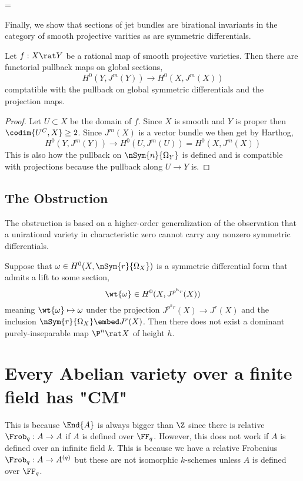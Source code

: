 =\documentclass[12pt]{article}
\begin{document}
Finally, we show that sections of jet bundles are birational invariants in the category of smooth projective varities as are symmetric differentials.

\begin{prop}
Let $f : X \rat Y$ be a rational map of smooth projective varieties. Then there are functorial pullback maps on global sections,
\[ H^0(Y, J^m(Y)) \to H^0(X, J^m(X)) \]
comptatible with the pullback on global symmetric differentials and the projection maps.
\end{prop}

\begin{proof}
Let $U \subset X$ be the domain of $f$. Since $X$ is smooth and $Y$ is proper then $\codim{U^C,X} \ge 2$. Since $J^m(X)$ is a vector bundle we then get by Harthog,
\[ H^0(Y, J^m(Y)) \to H^0(U, J^m(U)) = H^0(X, J^m(X)) \]
This is also how the pullback on $\nSym{n}{\Omega_Y}$ is defined and is compatible with projections because the pullback along $U \to Y$ is. 
\end{proof}


\subsection{The Obstruction}

The obstruction is based on a higher-order generalization of the observation that a unirational variety in characteristic zero cannot carry any nonzero symmetric differentials.

\begin{thm}
Suppose that $\omega \in H^0(X, \nSym{r}{\Omega_X})$ is a symmetric differential form that admits a lift to some section,
\[ \wt{\omega} \in H^0(X, J^{p^h r}(X)) \]
meaning $\wt{\omega} \mapsto \omega$ under the projection $J^{p^h r}(X) \to J^r(X)$ and the inclusion $\nSym{r}{\Omega_X} \embed J^r(X)$. Then there does not exist a dominant purely-inseparable map $\P^n \rat X$ of height $h$.
\end{thm} 


\section{Every Abelian variety over a finite field has "CM"}

This is because $\End{A}$ is always bigger than $\Z$ since there is relative $\Frob_q : A \to A$ if $A$ is defined over $\FF_q$. However, this does not work if $A$ is defined over an infinite field $k$. This is because we have a relative Frobenius $\Frob_q : A \to A^{(q)}$ but these are not isomorphic $k$-schemes unless $A$ is defined over $\FF_q$.
\end{document}
